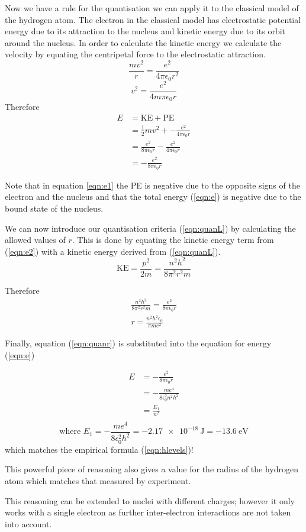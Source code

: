 \documentclass[main.tex]{subfiles}
\begin{document}
Now we have a rule for the quantisation we can apply it to the classical model of the hydrogen atom. The electron in the classical model has electrostatic potential energy due to its attraction to the nucleus and kinetic energy due to its orbit around the nucleus. In order to calculate the kinetic energy we calculate the velocity by equating the centripetal force to the electrostatic attraction.
\[ \frac{mv^2}{r} = \frac{e^2}{4\pi\epsilon_0 r^2} \]
\[ v^2 = \frac{e^2}{4m\pi\epsilon_0 r} \]
Therefore
\begin{align}
  E &= \text{KE} + \text{PE}\\
  &= \frac{1}{2}mv^2 + -\frac{e^2}{4\pi\epsilon_0 r}\label{eqn:e1}\\
  &= \frac{e^2}{8\pi\epsilon_0 r} - \frac{e^2}{4\pi\epsilon_0 r}\label{eqn:e2}\\
  &= -\frac{e^2}{8\pi\epsilon_0 r}\label{eqn:e}
\end{align}

Note that in equation \ref{eqn:e1} the PE is negative due to the opposite signs of the electron and the nucleus and that the total energy (\ref{eqn:e}) is negative due to the bound state of the nucleus.

We can now introduce our quantisation criteria (\ref{eqn:quanL}) by calculating the allowed values of $r$. This is done by equating the kinetic energy term from (\ref{eqn:e2}) with a kinetic energy derived from (\ref{eqn:quanL}).
\begin{equation}\label{egn:quantatisedr}
  \text{KE} = \frac{p^2}{2m} = \frac{n^2h^2}{8\pi^2r^2m}
\end{equation}

Therefore
\begin{align}
  \frac{n^2h^2}{8\pi^2r^2m} = \frac{e^2}{8\pi\epsilon_0 r}\\
  r = \frac{n^2h^2\epsilon_0}{\pi me^2}\label{eqn:quanr}
\end{align}

Finally, equation (\ref{eqn:quanr}) is substituted into the equation for energy (\ref{eqn:e})

\begin{align*}
  E &= -\frac{e^2}{8\pi\epsilon_0 r}\\
  &=  -\frac{me^4}{8\epsilon_0^2 n^2h^2}\\
  &= \frac{E_1}{n^2}\\
\end{align*}
\[   \text{where } E_1 = -\frac{me^4}{8\epsilon_0^2 h^2} = \SI{-2.17e-18}{\joule} = \SI{-13.6}{\electronvolt} \]
which matches the empirical formula (\ref{eqn:hlevels})!

This powerful piece of reasoning also gives a value for the radius of the hydrogen atom which matches that measured by experiment.

This reasoning can be extended to nuclei with different charges; however it only works with a single electron as further inter-electron interactions are not taken into account.
\end{document}
